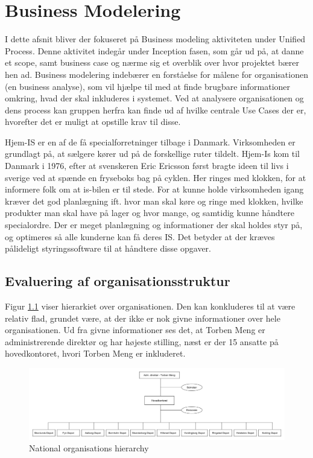 \chapter{Business Modelering}\label{ch:businessanalysis}

I dette afsnit bliver der fokuseret på Business modeling aktiviteten under Unified Process\cite{UnifiedProcess}. Denne aktivitet indegår under Inception fasen, som går ud på, at danne et scope, samt business case og nærme sig et overblik over hvor projektet bærer hen ad. Business modelering indebærer en forståelse for målene for organisationen (en business analyse), som vil hjælpe til med at finde brugbare informationer omkring, hvad der skal inkluderes i systemet\cite{UP}. Ved at analysere organisationen og dens process kan gruppen herfra kan finde ud af hvilke centrale Use Cases der er, hvorefter det er muligt at opstille krav til disse.

Hjem-IS er en af de få specialforretninger tilbage i Danmark. Virksomheden er grundlagt på, at sælgere kører ud på de forskellige ruter tildelt. Hjem-Is kom til Danmark i 1976, efter at svenskeren Eric Ericsson først bragte ideen til livs i sverige ved at spænde en fryseboks bag på cyklen. Her ringes med klokken, for at informere folk om at is-bilen er til stede. For at kunne holde virksomheden igang kræver det god planlægning ift. hvor man skal køre og ringe med klokken, hvilke produkter man skal have på lager og hvor mange, og samtidig kunne håndtere specialordre. Der er meget planlægning og informationer der skal holdes styr på, og optimeres så alle kunderne kan få deres IS. Det betyder at der kræves pålideligt styringssoftware til at håndtere disse opgaver. 
\section{Evaluering af organisationsstruktur}
Figur \ref{fig:global_hierarchy} viser hierarkiet over organisationen. Den kan konkluderes til at være relativ flad, grundet være, at der ikke er nok givne informationer over hele organisationen. Ud fra givne informationer ses det, at Torben Meng er administrerende direktør og har højeste stilling, næst er der 15 ansatte på hovedkontoret, hvori Torben Meng er inkluderet.

\begin{landscape}
    \begin{figure}[p]
        \centering
        \includegraphics[width=\hsize]{figures/businesscase/global_hierarchy.png}
        \caption{National organisations hierarchy}
        \label{fig:global_hierarchy}
    \end{figure}        
\end{landscape}

